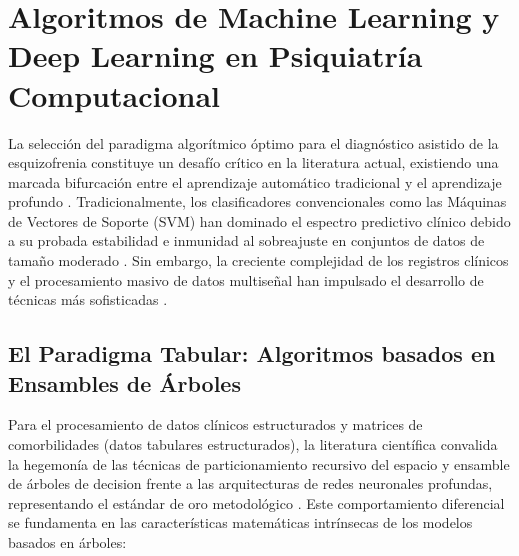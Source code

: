 \documentclass[12pt,a4paper,onecolumn,oneside]{report}
\begin{document}
\section{Algoritmos de Machine Learning y Deep Learning en Psiquiatría Computacional}

La selección del paradigma algorítmico óptimo para el diagnóstico asistido de la esquizofrenia constituye un desafío crítico en la literatura actual, existiendo una marcada bifurcación entre el aprendizaje automático tradicional y el aprendizaje profundo \cite{gogeascoechea2025precision, lai2021schizophrenia}. Tradicionalmente, los clasificadores convencionales como las Máquinas de Vectores de Soporte (SVM) han dominado el espectro predictivo clínico debido a su probada estabilidad e inmunidad al sobreajuste en conjuntos de datos de tamaño moderado \cite{lai2021schizophrenia, saboori2025predictive}. Sin embargo, la creciente complejidad de los registros clínicos y el procesamiento masivo de datos multiseñal han impulsado el desarrollo de técnicas más sofisticadas \cite{lopez2026ia, saboori2025predictive}.

\subsection{El Paradigma Tabular: Algoritmos basados en Ensambles de Árboles}
Para el procesamiento de datos clínicos estructurados y matrices de comorbilidades (datos tabulares estructurados), la literatura científica convalida la hegemonía de las técnicas de particionamiento recursivo del espacio y ensamble de árboles de decision frente a las arquitecturas de redes neuronales profundas, representando el estándar de oro metodológico \cite{grinsztajn2022why}. Este comportamiento diferencial se fundamenta en las características matemáticas intrínsecas de los modelos basados en árboles:
\end{document}
